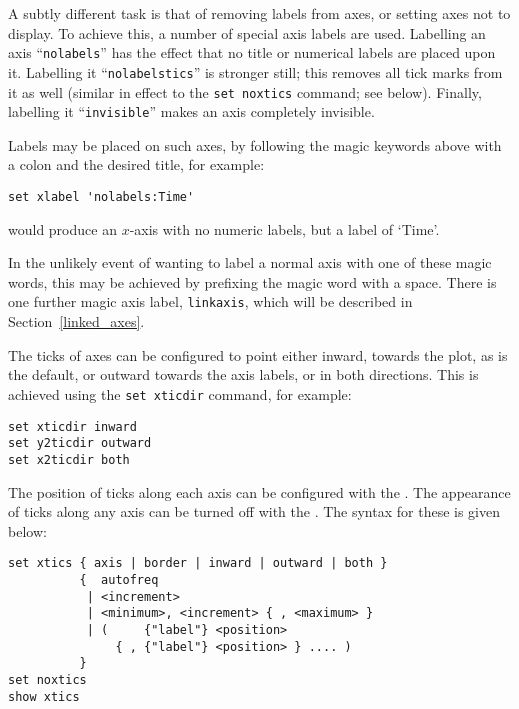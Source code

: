 A subtly different task is that of removing labels from axes, or setting axes
not to display. To achieve this, a number of special axis labels are used.
Labelling an axis ``{\tt nolabels}'' has the effect that no title or numerical
labels are placed upon it. Labelling it\label{nolabelstics}
``{\tt nolabelstics}'' is stronger still; this removes all tick marks from it as well
(similar in effect to the {\tt set noxtics} command; see below). Finally,
labelling it ``{\tt invisible}'' makes an axis completely invisible.

Labels may be placed on such axes, by following the magic keywords above with a
colon and the desired title, for example:

\begin{verbatim}
set xlabel 'nolabels:Time'
\end{verbatim}

\noindent would produce an $x$-axis with no numeric labels, but a label of
`Time'.

In the unlikely event of wanting
to label a normal axis with one of these magic words, this may be achieved by prefixing the magic
word with a space. There is one further magic axis label, {\tt linkaxis},
which will be described in Section~\ref{linked_axes}.

The ticks of axes can be configured to point either inward, towards the plot,
as is the default, or outward towards the axis labels, or in both directions.
This is achieved using the {\tt set xticdir} command, for example:

\begin{verbatim}
set xticdir inward
set y2ticdir outward
set x2ticdir both
\end{verbatim}

The position of ticks along each axis can be configured with the . The appearance of ticks along any axis can be turned off with the
. The syntax for these is given below:

\begin{verbatim}
set xtics { axis | border | inward | outward | both }
          {  autofreq
           | <increment>
           | <minimum>, <increment> { , <maximum> }
           | (     {"label"} <position>
               { , {"label"} <position> } .... )
          }
set noxtics
show xtics
\end{verbatim}

